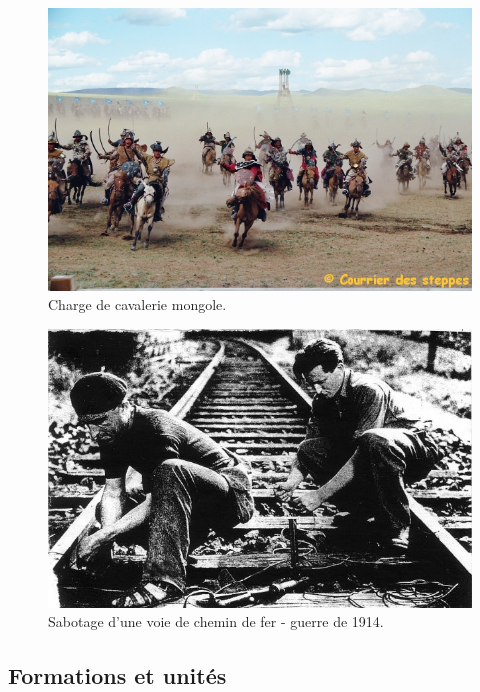 \documentclass{article}
\begin{document}
\begin{figure}[H]
	\begin{centering}
	\includegraphics[width=\linewidth]{../ressources/mongol_army}
	\caption{Charge de cavalerie mongole. \cite{mongol_cavalery}}
	\end{centering}
\end{figure}
\begin{figure}[H]
	\begin{centering}
	\includegraphics[width=\linewidth]{../ressources/sabotage_maquisards}
	\caption{Sabotage d'une voie de chemin de fer - guerre de 1914. \cite{sabotage}}
	\end{centering}
\end{figure}
\cite{war}


\subsection{Formations et unités}
\end{document}
